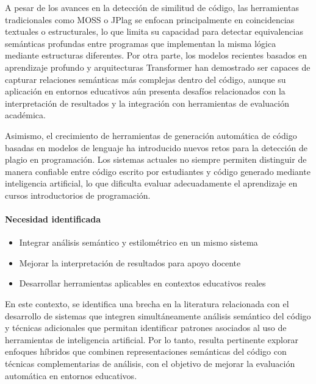 A pesar de los avances en la detección de similitud de código, las herramientas tradicionales como MOSS o JPlag se enfocan principalmente en coincidencias textuales o estructurales, lo que limita su capacidad para detectar equivalencias semánticas profundas entre programas que implementan la misma lógica mediante estructuras diferentes. Por otra parte, los modelos recientes basados en aprendizaje profundo y arquitecturas Transformer han demostrado ser capaces de capturar relaciones semánticas más complejas dentro del código, aunque su aplicación en entornos educativos aún presenta desafíos relacionados con la interpretación de resultados y la integración con herramientas de evaluación académica.

Asimismo, el crecimiento de herramientas de generación automática de código basadas en modelos de lenguaje ha introducido nuevos retos para la detección de plagio en programación. Los sistemas actuales no siempre permiten distinguir de manera confiable entre código escrito por estudiantes y código generado mediante inteligencia artificial, lo que dificulta evaluar adecuadamente el aprendizaje en cursos introductorios de programación.

\paragraph{Necesidad identificada}
\begin{itemize}
    \item Integrar análisis semántico y estilométrico en un mismo sistema
    \item Mejorar la interpretación de resultados para apoyo docente
    \item Desarrollar herramientas aplicables en contextos educativos reales
\end{itemize}

En este contexto, se identifica una brecha en la literatura relacionada con el desarrollo de sistemas que integren simultáneamente análisis semántico del código y técnicas adicionales que permitan identificar patrones asociados al uso de herramientas de inteligencia artificial. Por lo tanto, resulta pertinente explorar enfoques híbridos que combinen representaciones semánticas del código con técnicas complementarias de análisis, con el objetivo de mejorar la evaluación automática en entornos educativos.
